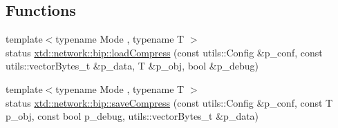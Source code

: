 \subsection*{Functions}
\begin{DoxyCompactItemize}
\item 
{\footnotesize template$<$typename Mode , typename T $>$ }\\status \hyperlink{namespacextd_1_1network_1_1bip_a48193a997dc7b1e8f5515c86ec50405c}{xtd\-::network\-::bip\-::load\-Compress} (const utils\-::\-Config \&p\-\_\-conf, const utils\-::vector\-Bytes\-\_\-t \&p\-\_\-data, T \&p\-\_\-obj, bool \&p\-\_\-debug)
\item 
{\footnotesize template$<$typename Mode , typename T $>$ }\\status \hyperlink{namespacextd_1_1network_1_1bip_a86bf6b3f22dd9b8c49cc138e4cd44921}{xtd\-::network\-::bip\-::save\-Compress} (const utils\-::\-Config \&p\-\_\-conf, const T p\-\_\-obj, const bool p\-\_\-debug, utils\-::vector\-Bytes\-\_\-t \&p\-\_\-data)
\end{DoxyCompactItemize}
